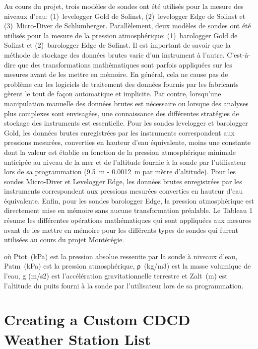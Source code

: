 \documentclass[12pt, letterpaper, fleqn]{report}
\begin{document}
Au cours du projet, trois modèles de sondes ont été utilisés pour la mesure des niveaux d’eau: (1) levelogger Gold de Solinst, (2) levelogger Edge de Solinst et (3) Micro-Diver de Schlumberger. Parallèlement, deux modèles de sondes ont été utilisés pour la mesure de la pression atmosphérique: (1) barologger Gold de Solinst et (2) barologger Edge de Solinst. Il est important de savoir que la méthode de stockage des données brutes varie d'un instrument à l'autre. C’est-à-dire que des transformations mathématiques sont parfois appliquées sur les mesures avant de les mettre en mémoire. En général, cela ne cause pas de problème car les logiciels de traitement des données fournis par les fabricants gèrent le tout de façon automatique et implicite. Par contre, lorsqu'une manipulation manuelle des données brutes est nécessaire ou lorsque des analyses plus complexes sont envisagées, une connaissance des différentes stratégies de stockage des instruments est essentielle.
Pour les sondes levelogger et barologger Gold, les données brutes enregistrées par les instruments correspondent aux pressions mesurées, converties en hauteur d'eau équivalente, moins une constante dont la valeur est établie en fonction de la pression atmosphérique minimale anticipée au niveau de la mer et de l'altitude fournie à la sonde par l'utilisateur lors de sa programmation (9.5 m - 0.0012 m par mètre d'altitude). Pour les sondes Micro-Diver et Levelogger Edge, les données brutes enregistrées par les instruments correspondent aux pressions mesurées converties en hauteur d'eau équivalente. Enfin, pour les sondes barologger Edge, la pression atmosphérique est directement mise en mémoire sans aucune transformation préalable. Le Tableau 1 résume les différentes opérations mathématiques qui sont appliquées aux mesures avant de les mettre en mémoire pour les différents types de sondes qui furent utilisées au cours du projet Montérégie.

où Ptot (kPa) est la pression absolue ressentie par la sonde à niveaux d'eau, Patm (kPa) est la pression atmosphérique, ρ (kg/m3) est la masse volumique de l'eau, g (m/s2) est l'accélération gravitationnelle terrestre et Zalt (m) est l'altitude du puits fourni à la sonde par l'utilisateur lors de sa programmation.


\appendix
\chapter{Creating a Custom CDCD Weather Station List}
\label{app:custom_station_list}
\end{document}
